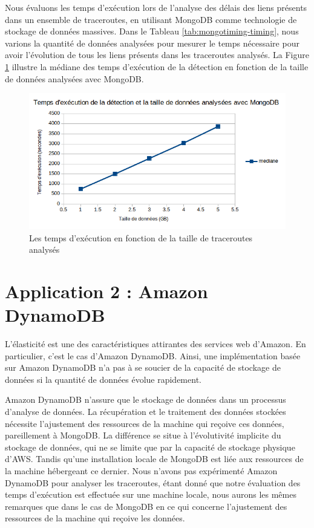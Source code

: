 Nous évaluons les temps d'exécution lors de l'analyse des délais des liens présents dans un ensemble de traceroutes, en utilisant MongoDB comme technologie de stockage de données massives.  Dans le Tableau \ref{tab:mongotiming-timing}, nous varions la quantité de données analysées pour mesurer le temps nécessaire pour avoir  l'évolution de tous les liens présents dans  les traceroutes analysés. 
La Figure 	\ref{fig:mongodbtiming} illustre la médiane  des temps d'exécution de la détection en fonction de  la taille de données analysées avec MongoDB. 
\begin{figure}[H]
	\centering
	\captionsetup{justification=centering}
	\includegraphics[width=0.9\linewidth]{illustrations/mongoDBtiming_0}
	\caption{Les temps d'exécution en fonction de la taille de traceroutes analysés}
	\label{fig:mongodbtiming}
\end{figure}




\section{Application 2 : Amazon DynamoDB}




L'élasticité est une des caractéristiques attirantes des services web d'Amazon. En particulier, c'est le cas d'Amazon DynamoDB. Ainsi, une implémentation basée sur Amazon DynamoDB  n'a pas à se soucier de la capacité  de stockage de données si la quantité de données évolue rapidement. 

 Amazon DynamoDB  n'assure que le stockage de données dans un processus d'analyse de données. La récupération et le traitement  des données stockées nécessite l'ajustement des ressources de la machine qui reçoive ces données, pareillement à MongoDB. La différence se situe à l'évolutivité implicite du stockage de données, qui ne se limite que par la capacité de stockage physique d'AWS. Tandis qu'une installation locale de MongoDB est liée aux ressources de la machine hébergeant ce dernier.  Nous n'avons pas expérimenté Amazon DynamoDB pour analyser les traceroutes, étant donné que notre évaluation des temps d'exécution est effectuée sur une machine locale, nous aurons les mêmes remarques que dans le cas de MongoDB en ce qui concerne l'ajustement des ressources de la machine qui reçoive les données.  
 
